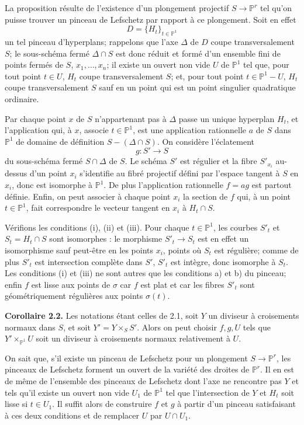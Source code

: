 \documentclass[11pt]{article}
\begin{document}
La proposition résulte de l'existence d'un plongement projectif $S\to\mathbb P^r$ tel qu'on puisse trouver un pinceau de Lefschetz par rapport à ce plongement. Soit en effet
\[
 D=\{H_t\}_{t\in\mathbb P^1}
\]
un tel pinceau d'hyperplans; rappelons que l'axe $\Delta$ de $D$ coupe transversalement $S$; le sous-schéma fermé $\Delta\cap S$ est donc réduit et formé d'un ensemble fini de points fermés de $S$, $x_1,\ldots,x_n$; il existe un ouvert non vide $U$ de $\mathbb P^1$ tel que, pour tout point $t\in U$, $H_t$ coupe transversalement $S$; et, pour tout point $t\in\mathbb P^1-U$, $H_t$ coupe transversalement $S$ sauf en un point qui est un point singulier quadratique ordinaire.

Par chaque point $x$ de $S$ n'appartenant pas à $\Delta$ passe un unique hyperplan $H_t$, et l'application qui, à $x$, associe $t\in\mathbb P^1$, est une application rationnelle $a$ de $S$ dans $\mathbb P^1$ de domaine de définition $S-(\Delta\cap S)$. On considère l'éclatement
\[
 g:S'\longrightarrow S
\]
du sous-schéma fermé $S\cap\Delta$ de $S$. Le schéma $S'$ est régulier et la fibre $S'_{x_i}$ au-dessus d'un point $x_i$ s'identifie au fibré projectif défini par l'espace tangent à $S$ en $x_i$, donc est isomorphe à $\mathbb P^1$. De plus l'application rationnelle $f=ag$ est partout définie. Enfin, on peut associer à chaque point $x_i$ la section de $f$ qui, à un point $t\in\mathbb P^1$, fait correspondre le vecteur tangent en $x_i$ à $H_t\cap S$.

Vérifions les conditions (i), (ii) et (iii). Pour chaque $t\in\mathbb P^1$, les courbes $S'_t$ et $S_t=H_t\cap S$ sont isomorphes : le morphisme $S'_t\to S_t$ est en effet un isomorphisme sauf peut-être en les points $x_i$, points où $S_t$ est régulière; comme de plus $S'_t$ est intersection complète dans $S'$, $S'_t$ est intègre, donc isomorphe à $S_t$. Les conditions (i) et (iii) ne sont autres que les conditions a) et b) du pinceau; enfin $f$ est lisse aux points de $\sigma$ car $f$ est plat et car les fibres $S'_t$ sont géométriquement régulières aux points $\sigma(t)$.

\textbf{Corollaire 2.2.} Les notations étant celles de 2.1, soit $Y$ un diviseur à croisements normaux dans $S$, et soit $Y'=Y\times_S S'$. Alors on peut choisir $f,g,U$ tels que $Y'\times_{\mathbb P^1}U$ soit un diviseur à croisements normaux relativement à $U$.

On sait que, s'il existe un pinceau de Lefschetz pour un plongement $S\to\mathbb P^r$, les pinceaux de Lefschetz forment un ouvert de la variété des droites de $\mathbb P^r$. Il en est de même de l'ensemble des pinceaux de Lefschetz dont l'axe ne rencontre pas $Y$ et tels qu'il existe un ouvert non vide $U_1$ de $\mathbb P^1$ tel que l'intersection de $Y$ et $H_t$ soit lisse si $t\in U_1$. Il suffit alors de construire $f$ et $g$ à partir d'un pinceau satisfaisant à ces deux conditions et de remplacer $U$ par $U\cap U_1$.
\end{document}
